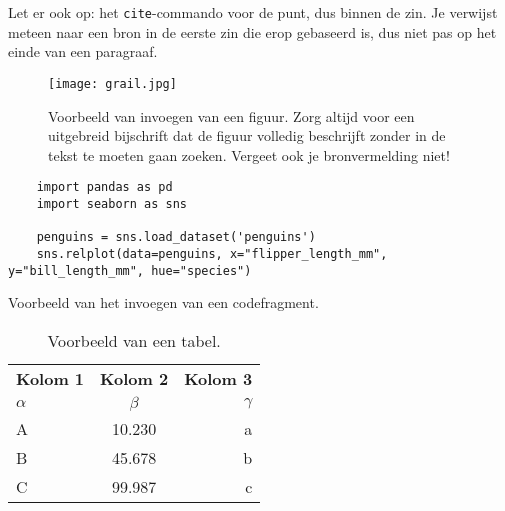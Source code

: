 Let er ook op: het \texttt{cite}-commando voor de punt, dus binnen de zin. Je verwijst meteen naar een bron in de eerste zin die erop gebaseerd is, dus niet pas op het einde van een paragraaf.

\begin{figure}
  \centering
  \texttt{[image: grail.jpg]}
  \caption[Voorbeeld figuur.]{\label{fig:grail}Voorbeeld van invoegen van een figuur. Zorg altijd voor een uitgebreid bijschrift dat de figuur volledig beschrijft zonder in de tekst te moeten gaan zoeken. Vergeet ook je bronvermelding niet!}
\end{figure}

\begin{listing}
  \begin{verbatim}
    import pandas as pd
    import seaborn as sns

    penguins = sns.load_dataset('penguins')
    sns.relplot(data=penguins, x="flipper_length_mm", y="bill_length_mm", hue="species")
  \end{verbatim}
  \caption[Voorbeeld codefragment]{Voorbeeld van het invoegen van een codefragment.}
\end{listing}

\lipsum[7-20]

\begin{table}
  \centering
  \begin{tabular}{lcr}
    \toprule
    \textbf{Kolom 1} & \textbf{Kolom 2} & \textbf{Kolom 3} \\
    $\alpha$         & $\beta$          & $\gamma$         \\
    \midrule
    A                & 10.230           & a                \\
    B                & 45.678           & b                \\
    C                & 99.987           & c                \\
    \bottomrule
  \end{tabular}
  \caption[Voorbeeld tabel]{\label{tab:example}Voorbeeld van een tabel.}
\end{table}

